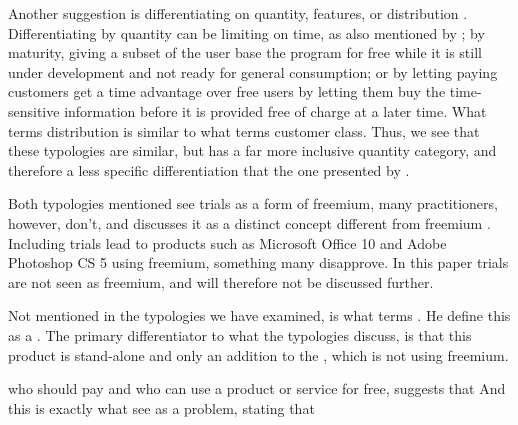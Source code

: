 Another suggestion is differentiating on quantity, features, or distribution \citep{pujol2010}. Differentiating by quantity can \eg be limiting on time, as also mentioned by \citet{anderson2009}; by maturity, \eg giving a subset of the user base the program for free while it is still under development and not ready for general consumption; or by letting paying customers get a time advantage over free users by letting them buy the time-sensitive information before it is provided free of charge at a later time. What \citet{pujol2010} terms distribution is similar to what \citet{anderson2009} terms customer class. Thus, we see that these typologies are similar, but \citet{pujol2010} has a far more inclusive quantity category, and therefore a less specific differentiation that the one presented by \citet{anderson2009}.

Both typologies mentioned see trials as a form of freemium, many practitioners, however, don't, and discusses it as a distinct concept different from freemium \citep[\eg][]{robles2009,hudson2009,fry2010}. Including trials lead to products such as Microsoft Office 10 and Adobe Photoshop CS 5 using freemium, something many disapprove. In this paper trials are not seen as freemium, and will therefore not be discussed further.

Not mentioned in the typologies we have examined, is what \citet{murphy2010} terms . He define this as a  \citep[]{murphy2010}. The primary differentiator to what the typologies discuss, is that this product is stand-alone and only an addition to the , which is not using freemium.

 who should pay and who can use a product or service for free, \citet{chen2009} suggests that  And this is exactly what \citet{hudson2009} see as a problem, stating that 

% 
% 
% 

